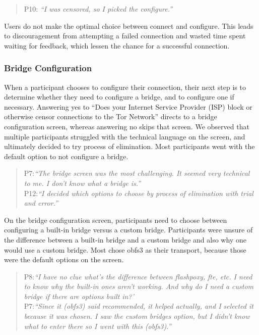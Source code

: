 \documentclass[USenglish,oneside,twocolumn]{article}
\begin{document}
\begin{quotation}
\noindent P10: \textit{``I was censored, so I picked the configure.''}
\end{quotation}

Users do not make the optimal choice between connect and configure. This leads to discouragement from attempting a failed connection and wasted time spent waiting for feedback, which lessen the chance for a successful connection. 

\subsubsection{Bridge Configuration} 
When a participant chooses to configure their connection, their next step is to determine whether they need to configure a bridge, and to configure one if necessary. Answering yes to ``Does your Internet Service Provider (ISP) block or otherwise censor connections to the Tor Network'' directs to a bridge configuration screen, whereas answering no skips that screen. We observed that multiple participants struggled with the technical language on the screen, and ultimately decided to try process of elimination. Most participants went with the default option to not configure a bridge. 

\begin{quotation}
\noindent P7:\textit{``The bridge screen was the most challenging. It seemed very technical to me. I don't know what a bridge is.''}\\

\noindent P12:\textit{``I decided which options to choose by process of elimination with trial and error.''}
\end{quotation} 

On the bridge configuration screen, participants need to choose between configuring a built-in bridge versus a custom bridge. Participants were unsure of the difference between a built-in bridge and a custom bridge and also why one would use a custom bridge. Most chose obfs3 as their transport, because those were the default options on the screen. 

\begin{quotation} 
\noindent P8:\textit{``I have no clue what's the difference between flashpoxy, fte, etc. I need to know why the built-in ones aren't working. And why do I need a custom bridge if there are options built in?'}\\

\noindent P7:\textit{``Since it (obfs3) said recommended, it helped actually, and I selected it because it was chosen. I saw the custom bridges option, but I didn't know what to enter there so I went with this (obfs3).''}
\end{quotation} 
\end{document}
